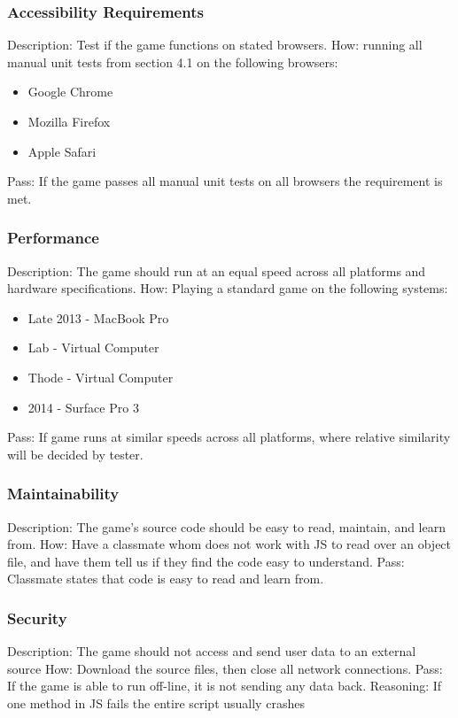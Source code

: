 \documentclass{article}
\begin{document}
\subsubsection{Accessibility Requirements}
Description: Test if the game functions on stated browsers.
How: running all manual unit tests from section 4.1 on the following browsers:
\begin{itemize}
\item Google Chrome
\item Mozilla Firefox
\item Apple Safari
\end{itemize}
Pass:  If the game passes all manual unit tests on all browsers the requirement
 is met.\newline


 \subsubsection{Performance}
Description: The game should run at an equal speed across all platforms and 
hardware specifications.  \newline
How: Playing a standard game on the following systems: 
\begin{itemize}
\item Late 2013 - MacBook Pro
\item Lab - Virtual Computer
\item Thode - Virtual Computer
\item 2014 - Surface Pro 3
\end{itemize}
Pass: If game runs at similar speeds across all platforms, where relative 
similarity will be decided by tester.

 \subsubsection{Maintainability}
 Description: The game's source code should be easy to read, maintain, and 
 learn from. \newline
 How: Have a classmate whom does not work with JS to read over an object file, 
 and have them tell us if they find the code easy to understand. \newline
 Pass: Classmate states that code is easy to read and learn from.

 \subsubsection{Security}
Description: The game should not access and send user data to an external 
source \newline
How: Download the source files, then close all network connections.\newline
Pass: If the game is able to run off-line, it is not sending any data back.
Reasoning: If one method in JS fails the entire script usually crashes
\end{document}
